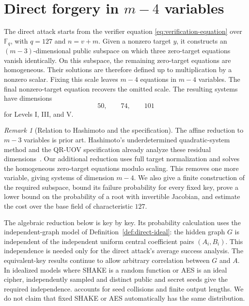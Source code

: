 \documentclass[11pt,a4paper]{article}
\theoremstyle{definition}
\theoremstyle{remark}
\newtheorem{remark}[theorem]{Remark}
\newcommand{\F}{\mathbb F}
\begin{document}
\section{\texorpdfstring{Direct forgery in $m-4$ variables}{Direct forgery in m-4 variables}}\label{sec:direct}

The direct attack starts from the verifier equation
\eqref{eq:verification-equation} over $\F_q$, with $q=127$ and
$n=v+m$.  Given a nonzero target $y$, it constructs an $(m-3)$-dimensional
public subspace on which three zero-target equations vanish identically.  On
this subspace, the remaining zero-target equations are homogeneous.  Their
solutions are therefore defined up to multiplication by a nonzero scalar.
Fixing this scale leaves $m-4$ equations in $m-4$ variables.  The final
nonzero-target equation recovers the omitted scale.  The resulting systems
have dimensions
\[
 50,\qquad74,\qquad101
\]
for Levels I, III, and V.

\begin{remark}[Relation to Hashimoto and the specification]\label{rem:direct-prior-art}
The affine reduction to $m-3$ variables is prior art.  Hashimoto's
underdetermined quadratic-system method and the QR-UOV specification already analyze these
residual dimensions~\cite{QRUOVSpec,Hashimoto2023}.  Our additional reduction
uses full target normalization and solves the homogeneous zero-target
equations modulo scaling.  This removes one more variable, giving systems of
dimension $m-4$.  We also give a finite construction of the required
subspace, bound its failure probability for every fixed key, prove a lower
bound on the probability of a root with invertible Jacobian, and estimate the
cost over the base field of characteristic $127$.
\end{remark}

The algebraic reduction below is key by key.  Its probability calculation uses
the independent-graph model of Definition~\ref{def:direct-ideal}: the
hidden graph $G$ is independent of the independent uniform central coefficient
pairs $(A_i,B_i)$.  This independence is needed only for the direct attack's
average success analysis.  The equivalent-key results continue to allow
arbitrary correlation between $G$ and $A$.  In idealized models where SHAKE is
a random function or AES is an ideal cipher, independently sampled and
distinct public and secret seeds give the required independence.
 accounts for seed collisions and finite output
lengths.  We do not claim that fixed SHAKE or AES automatically has the same
distribution.
\end{document}

